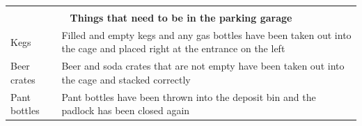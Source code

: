 \documentclass[a4paper,10pt,oneside,article]{memoir}
\begin{document}
\newpage
\vspace{0.5cm}
\noindent
\begin{tabular}{|l|l|}
    \hline
    \multicolumn{2}{|c|}{} \\
    \multicolumn{2}{|c|}{\Large \textbf{Things that need to be in the parking garage}} \\
    \hline
    \begin{minipage}[t]{0.15\textwidth}
        Kegs
    \end{minipage} & 
    \begin{minipage}[t]{0.80\textwidth}
        Filled and empty kegs and any gas bottles have been taken out into the cage and
        placed right at the entrance on the left
    \end{minipage} \\
    \hline
    \begin{minipage}[t]{0.15\textwidth}
        Beer crates
    \end{minipage} & 
    \begin{minipage}[t]{0.80\textwidth}
        Beer and soda crates that are not empty have been taken out into the cage and stacked correctly
    \end{minipage} \\
    \hline
    \begin{minipage}[t]{0.15\textwidth}
        Pant bottles
    \end{minipage} & 
    \begin{minipage}[t]{0.80\textwidth}
        Pant bottles have been thrown into the deposit bin and the padlock has been closed again
    \end{minipage} \\
    \hline
\end{tabular}
\end{document}
